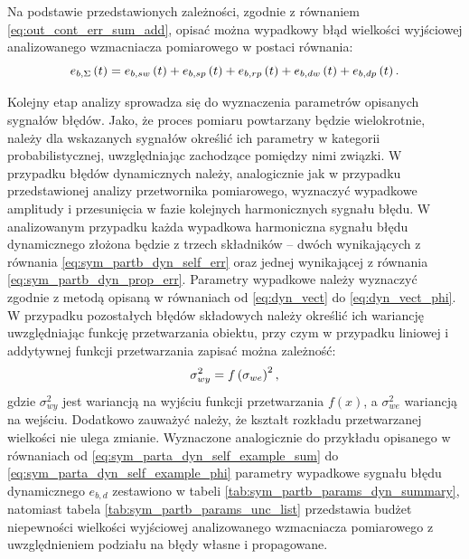 Na podstawie przedstawionych zależności, zgodnie z równaniem \eqref{eq:out_cont_err_sum_add}, opisać można wypadkowy błąd wielkości wyjściowej analizowanego wzmacniacza pomiarowego w postaci równania:
\begin{equation}
e_{b,\Sigma} \left(t\right) = e_{b,sw} \left(t\right) + e_{b,sp} \left(t\right) + e_{b,rp} \left(t\right) + e_{b,dw} \left(t\right) + e_{b,dp} \left(t\right) \label{eq:sym_partb_error_sum}.
\end{equation}

Kolejny etap analizy sprowadza się do wyznaczenia parametrów opisanych sygnałów błędów. Jako, że proces pomiaru powtarzany będzie wielokrotnie, należy dla wskazanych sygnałów określić ich parametry w kategorii probabilistycznej, uwzględniając zachodzące pomiędzy nimi związki. W przypadku błędów dynamicznych należy, analogicznie jak w przypadku przedstawionej analizy przetwornika pomiarowego, wyznaczyć wypadkowe amplitudy i przesunięcia w fazie kolejnych harmonicznych sygnału błędu. W analizowanym przypadku każda wypadkowa harmoniczna sygnału błędu dynamicznego złożona będzie z trzech składników -- dwóch wynikających z równania \eqref{eq:sym_partb_dyn_self_err} oraz jednej wynikającej z równania \eqref{eq:sym_partb_dyn_prop_err}. Parametry wypadkowe należy wyznaczyć zgodnie z metodą opisaną w równaniach od \eqref{eq:dyn_vect} do \eqref{eq:dyn_vect_phi}. W przypadku pozostałych błędów składowych należy określić ich wariancję uwzględniając funkcję przetwarzania obiektu, przy czym w przypadku liniowej i addytywnej funkcji przetwarzania zapisać można zależność:
\begin{equation}
\sigma_{wy}^{2} = f \left(\sigma_{we}\right)^{2} \label{eq:var_function},
\end{equation}
gdzie $\sigma_{wy}^{2}$ jest wariancją na wyjściu funkcji przetwarzania $f(x)$, a $\sigma_{we}^{2}$ wariancją na wejściu. Dodatkowo zauważyć należy, że kształt rozkładu przetwarzanej wielkości nie ulega zmianie. Wyznaczone analogicznie do przykładu opisanego w równaniach od \eqref{eq:sym_parta_dyn_self_example_sum} do \eqref{eq:sym_parta_dyn_self_example_phi} parametry wypadkowe sygnału błędu dynamicznego $e_{b,d}$ zestawiono w tabeli \ref{tab:sym_partb_params_dyn_summary}, natomiast tabela \ref{tab:sym_partb_params_unc_list} przedstawia budżet niepewności wielkości wyjściowej analizowanego wzmacniacza pomiarowego z uwzględnieniem podziału na błędy własne i propagowane.

